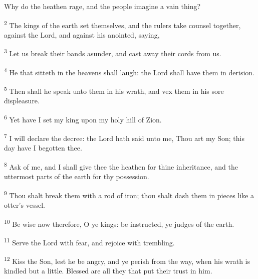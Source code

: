 \begin{quotex}
Why do the heathen rage, and the people imagine a vain thing?

\textsuperscript{2} The kings of the earth set themselves, and the rulers take counsel together, against the Lord, and against his anointed, saying,

\textsuperscript{3} Let us break their bands asunder, and cast away their cords from us.

\textsuperscript{4} He that sitteth in the heavens shall laugh: the Lord shall have them in derision.

\textsuperscript{5} Then shall he speak unto them in his wrath, and vex them in his sore displeasure.

\textsuperscript{6} Yet have I set my king upon my holy hill of Zion.

\textsuperscript{7} I will declare the decree: the Lord hath said unto me, Thou art my Son; this day have I begotten thee.

\textsuperscript{8} Ask of me, and I shall give thee the heathen for thine inheritance, and the uttermost parts of the earth for thy possession.

\textsuperscript{9} Thou shalt break them with a rod of iron; thou shalt dash them in pieces like a otter's vessel.

\textsuperscript{10} Be wise now therefore, O ye kings: be instructed, ye judges of the earth.

\textsuperscript{11} Serve the Lord with fear, and rejoice with trembling.

\textsuperscript{12} Kiss the Son, lest he be angry, and ye perish from the way, when his wrath is kindled but a little. Blessed are all they that put their trust in him.
\end{quotex}


